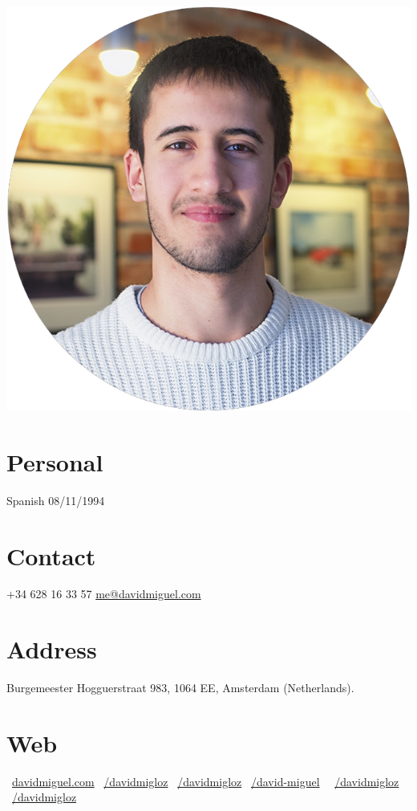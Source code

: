 \documentclass[]{friggeri-cv}
\begin{document}
      

\begin{aside}
  \includegraphics[scale=0.18]{img/profile.png}
  \section{Personal}
    Spanish
    08/11/1994
    ~  
  \section{Contact}
    +34 628 16 33 57
    \href{mailto:me@davidmiguel.com}{me@davidmiguel.com}
    ~  
  \section{Address}
    Burgemeester Hogguerstraat 983,
    1064 EE, Amsterdam
    (Netherlands).
    ~    
  \section{Web}
    \faGlobe\ \href{http://davidmiguel.com}{davidmiguel.com}
    \faLinkedin\ \href{https://www.linkedin.com/in/davidmigloz}{/davidmigloz}
    \faGithub\ \href{https://github.com/davidmigloz/}{/davidmigloz}
    \faStackOverflow\ \href{http://stackoverflow.com/users/6305235/david-miguel}{/david-miguel}    
    \faFacebook\ \ \href{https://www.facebook.com/DavidMigLoz}{/davidmigloz}
    \faTwitter\ \href{https://twitter.com/DavidMigLoz}{/davidmigloz}
    ~

\end{aside}
\end{document}
